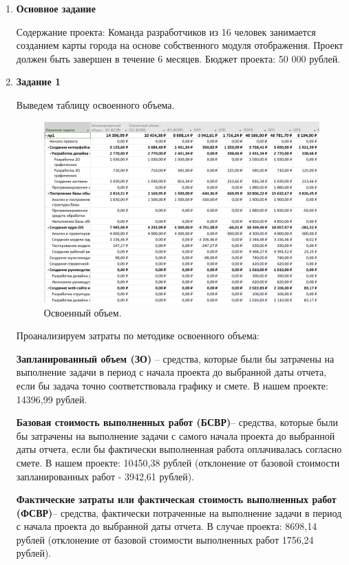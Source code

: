 \documentclass[a4paper,14pt]{extreport} %
\begin{document}
\begin{enumerate}

\item \textbf{Основное задание}

Содержание проекта: Команда разработчиков из 16 человек занимается созданием карты города на основе собственного модуля отображения. Проект должен быть завершен в течение 6 месяцев. Бюджет проекта: 50 000 рублей.

\item \textbf{Задание 1}

Выведем таблицу освоенного объема.

\begin{figure}[H]
  \centering
  \caption{Освоенный объем. }
  \includegraphics[scale=0.55]{1}
\end{figure}

Проанализируем затраты по методике освоенного объема:

\textbf{Запланированный объем (ЗО)} -- средства, которые были бы затрачены на выполнение задачи в период с начала проекта до выбранной даты отчета, если бы задача точно соответствовала графику и смете. В нашем проекте: 14396,99 рублей.

\textbf{Базовая стоимость выполненных работ (БСВР)}-- средства, которые были бы затрачены на выполнение задачи с самого начала проекта до выбранной даты отчета, если бы фактически выполненная работа оплачивалась согласно смете. В нашем проекте: 10450,38 рублей (отклонение от базовой стоимости запланированных работ - 3942,61 рублей).

\textbf{Фактические затраты или фактическая стоимость выполненных работ (ФСВР)}-- средства, фактически потраченные на выполнение задачи в период с начала проекта до выбранной даты отчета. В случае проекта: 8698,14 рублей (отклонение от базовой стоимости выполненных работ 1756,24 рублей). 


\end{enumerate}
\end{document}
